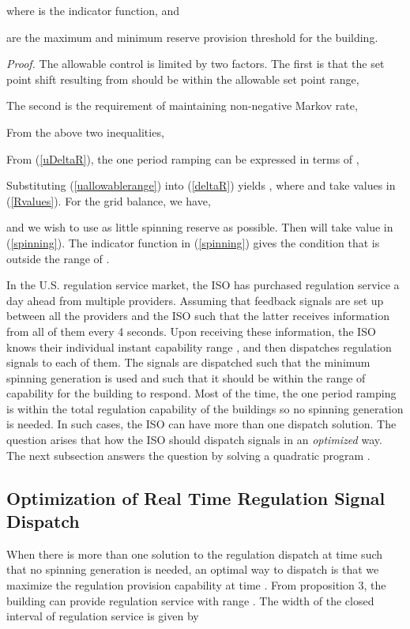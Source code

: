 \documentclass[journal]{IEEEtran}
\begin{document}
where  is the indicator function, and

are the maximum and minimum reserve provision threshold for the building.

\textit{Proof.} The allowable control  is limited by two factors. The first is that the set point shift resulting from  should be within the allowable set point range,

The second is the requirement of maintaining non-negative Markov rate,

From the above two inequalities,

From (\ref{uDeltaR}), the one period ramping can be expressed in terms of ,

Substituting (\ref{uallowablerange}) into (\ref{deltaR}) yields , where  and   take values in (\ref{Rvalues}). For the grid balance, we have,

and we wish to use as little spinning reserve as possible. Then  will take value in (\ref{spinning}). The indicator function in (\ref{spinning}) gives the condition that  is outside the range of .

In the U.S. regulation service market, the ISO has purchased regulation service a day ahead from multiple  providers. Assuming that feedback signals are set up between all the providers and the ISO such that the latter receives information from all of them every 4 seconds. Upon receiving these information, the ISO knows their individual instant capability range , and then dispatches regulation signals to each of them. The signals are dispatched such that the minimum spinning generation is used and such that it should be within the range of capability for the building to respond. Most of the time, the one period ramping is within the total regulation capability of the  buildings so no spinning generation is needed. In such cases, the ISO can have more than one dispatch solution. The question arises that how the ISO should dispatch signals in an \textit{optimized} way. The next subsection answers the question by solving a quadratic program .

\subsection{Optimization of Real Time Regulation Signal Dispatch}
When there is more than one solution to the regulation dispatch at time  such that no spinning generation is needed, an optimal way to dispatch is that we maximize the regulation provision capability at time . From proposition 3, the  building can provide regulation service with range . The width of the closed interval of regulation service is given by
\end{document}
